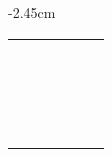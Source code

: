 \begin{center}
\begin{adjustwidth}{-2.45cm}{}
\begin{tabular}{|c c c c c c|}
             &  &  &  &  &  \\
             &  &  &  &  &  \\
             &  &  &  &  &  \\
             &  &  &  &  &  \\
             &  &  &  &  &  \\
             &  &  &  &  &  \\
             &  &  &  &  &  \\
             &  &  &  &  &  \\
             &  &  &  &  &  \\
             &  &  &  &  &  \\
             &  &  &  &  &  \\
             &  &  &  &  &  \\
             &  &  &  &  &  \\
             &  &  &  &  &  \\
             &  &  &  &  &  \\
             &  &  &  &  &  \\
             &  &  &  &  &  \\
             &  &  &  &  &  \\
            \hline
        \end{tabular}
    \end{adjustwidth}
\end{center}

